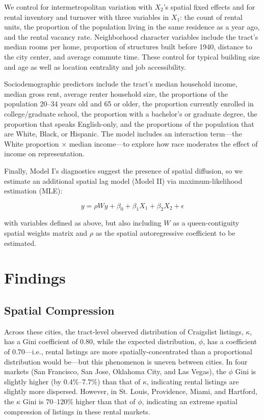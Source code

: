 \documentclass[11pt,letterpaper]{article}
\begin{document}
We control for intermetropolitan variation with $X_2$'s spatial fixed effects and for rental inventory and turnover with three variables in $X_1$: the count of rental units, the proportion of the population living in the same residence as a year ago, and the rental vacancy rate. Neighborhood character variables include the tract's median rooms per home, proportion of structures built before 1940, distance to the city center, and average commute time. These control for typical building size and age as well as location centrality and job accessibility.

Sociodemographic predictors include the tract's median household income, median gross rent, average renter household size, the proportions of the population 20--34 years old and 65 or older, the proportion currently enrolled in college/graduate school, the proportion with a bachelor's or graduate degree, the proportion that speaks English-only, and the proportions of the population that are White, Black, or Hispanic. The model includes an interaction term---the White proportion $\times$ median income---to explore how race moderates the effect of income on representation.

Finally, Model I's diagnostics suggest the presence of spatial diffusion, so we estimate an additional spatial lag model (Model II) via maximum-likelihood estimation (MLE):

\begin{equation}
	\label{eq:regression_spatial_formula}
	y = \rho Wy + \beta_0 + \beta_1 X_1 + \beta_2 X_2 + \epsilon
\end{equation}

with variables defined as above, but also including $W$ as a queen-contiguity spatial weights matrix and $\rho$ as the spatial autoregressive coefficient to be estimated.


\section{Findings}

\subsection{Spatial Compression}

Across these cities, the tract-level observed distribution of Craigslist listings, $\kappa$, has a Gini coefficient of 0.80, while the expected distribution, $\phi$, has a coefficient of 0.70---i.e., rental listings are more spatially-concentrated than a proportional distribution would be---but this phenomenon is uneven between cities. In four markets (San Francisco, San Jose, Oklahoma City, and Las Vegas), the $\phi$ Gini is slightly higher (by 0.4\%--7.7\%) than that of $\kappa$, indicating rental listings are slightly more dispersed. However, in St. Louis, Providence, Miami, and Hartford, the $\kappa$ Gini is 70--120\% higher than that of $\phi$, indicating an extreme spatial compression of listings in these rental markets.
\end{document}
